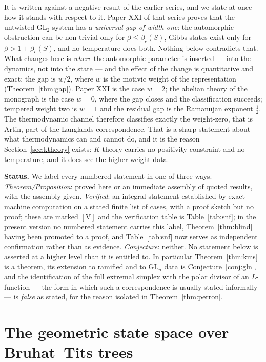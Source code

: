 \documentclass[11pt]{amsart}
\numberwithin{equation}{section}
\theoremstyle{definition}
\theoremstyle{remark}
\newcommand{\GL}{\mathrm{GL}}
\begin{document}
It is written against a negative result of the earlier series, and we state at once how
it stands with respect to it. Paper XXI of that series proves that the untwisted $\GL_2$
system has a \emph{universal gap of width one}: the automorphic obstruction can be
non-trivial only for $\beta\le\beta_c(S)$, Gibbs states exist only for
$\beta>1+\beta_c(S)$, and no temperature does both. Nothing below contradicts that.
What changes here is \emph{where} the automorphic parameter is inserted --- into the
dynamics, not into the state --- and the effect of the change is quantitative and exact:
the gap is $w/2$, where $w$ is the motivic weight of the representation
(Theorem~\ref{thm:gap}). Paper XXI is the case $w=2$; the abelian theory of the monograph
is the case $w=0$, where the gap closes and the classification succeeds; tempered weight
two is $w=1$ and the residual gap is the Ramanujan exponent $\tfrac12$. The thermodynamic
channel therefore classifies exactly the weight-zero, that is Artin, part of the Langlands
correspondence. That is a sharp statement about what thermodynamics can and cannot do,
and it is the reason Section~\ref{sec:ktheory} exists: $K$-theory carries no positivity
constraint and no temperature, and it does see the higher-weight data.

\smallskip
\noindent\textbf{Status.} We label every numbered statement in one of three ways.
\emph{Theorem/Proposition}: proved here or an immediate assembly of quoted results, with
the assembly given. \emph{Verified}: an integral statement established by exact machine
computation on a stated finite list of cases, with a proof sketch but no proof; these are
marked $[\mathrm{V}]$ and the verification table is Table~\ref{tab:snf}; in the present
version no numbered statement carries this label, Theorem~\ref{thm:blind} having been
promoted to a proof, and Table~\ref{tab:snf} now serves as independent confirmation
rather than as evidence. \emph{Conjecture}:
neither. No statement below is asserted at a higher level than it is entitled to. In
particular Theorem~\ref{thm:kms} is a theorem, its extension to ramified and to $\GL_n$
data is Conjecture~\ref{conj:gln}, and the identification of the full extremal simplex
with the polar divisor of an $L$-function --- the form in which such a correspondence is
usually stated informally --- is \emph{false} as stated, for the reason isolated in
Theorem~\ref{thm:perron}.

\section{The geometric state space over Bruhat--Tits trees}\label{sec:geometry}
\end{document}
